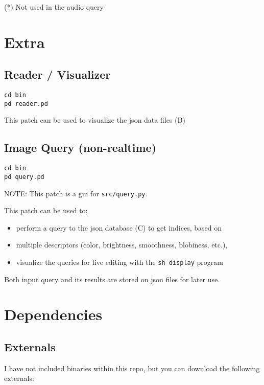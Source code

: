 (*) Not used in the audio query


\section*{Extra}


\subsection*{Reader / Visualizer}

\begin{verbatim}
cd bin
pd reader.pd
\end{verbatim}

This patch can be used to visualize the \gls{json} data files (B)




\subsection*{Image Query (non-realtime)}

\begin{verbatim}
cd bin
pd query.pd
\end{verbatim}

NOTE: This patch is a gui for \texttt{src/query.py}.

This patch can be used to:

\begin{itemize}
  \singlespacing
\tightlist
\item
  perform a query to the \gls{json} database (C) to get indices, based on
\item
  multiple descriptors (color, brightness, smoothness, blobiness, etc.),
\item
  visualize the queries for live editing with the \texttt{sh\ display} program
\end{itemize}

Both input query and its results are stored on \gls{json} files for later use.




\section*{Dependencies}


\subsection*{Externals}

I have not included binaries within this repo, but you can download the following externals:

